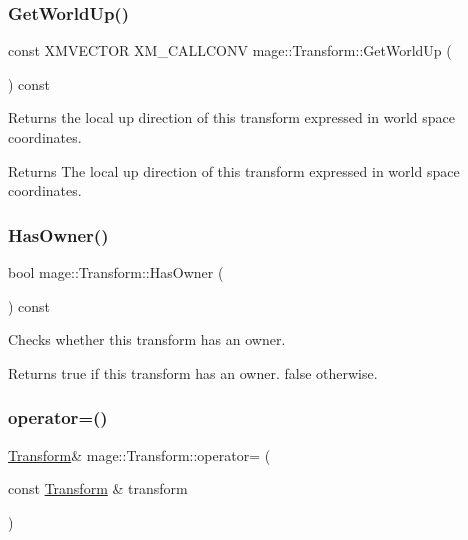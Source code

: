 \subsubsection{\texorpdfstring{Get\+World\+Up()}{GetWorldUp()}}
{\footnotesize\ttfamily const X\+M\+V\+E\+C\+T\+OR X\+M\+\_\+\+C\+A\+L\+L\+C\+O\+NV mage\+::\+Transform\+::\+Get\+World\+Up (\begin{DoxyParamCaption}{ }\end{DoxyParamCaption}) const\hspace{0.3cm}{\ttfamily [noexcept]}}

Returns the local up direction of this transform expressed in world space coordinates.

\begin{DoxyReturn}{Returns}
The local up direction of this transform expressed in world space coordinates. 
\end{DoxyReturn}
\hypertarget{classmage_1_1_transform_ac24796b2d6179c1488410d36afdf6b68}{}\label{classmage_1_1_transform_ac24796b2d6179c1488410d36afdf6b68} 
\subsubsection{\texorpdfstring{Has\+Owner()}{HasOwner()}}
{\footnotesize\ttfamily bool mage\+::\+Transform\+::\+Has\+Owner (\begin{DoxyParamCaption}{ }\end{DoxyParamCaption}) const\hspace{0.3cm}{\ttfamily [noexcept]}}

Checks whether this transform has an owner.

\begin{DoxyReturn}{Returns}
{\ttfamily true} if this transform has an owner. {\ttfamily false} otherwise. 
\end{DoxyReturn}
\hypertarget{classmage_1_1_transform_a5541fef38c72592a32c06fcbb2199d8d}{}\label{classmage_1_1_transform_a5541fef38c72592a32c06fcbb2199d8d} 
\subsubsection{\texorpdfstring{operator=()}{operator=()}\hspace{0.1cm}{\footnotesize\ttfamily [1/2]}}
{\footnotesize\ttfamily \hyperlink{classmage_1_1_transform}{Transform}\& mage\+::\+Transform\+::operator= (\begin{DoxyParamCaption}\item[{const \hyperlink{classmage_1_1_transform}{Transform} \&}]{transform }\end{DoxyParamCaption})\hspace{0.3cm}{\ttfamily [noexcept]}}

